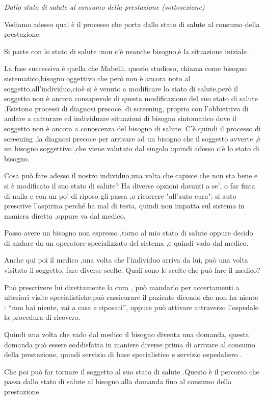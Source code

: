 \documentclass[]{article}
\begin{document}
\emph{Dallo stato di salute al consumo della prestazione (sottosezione)}

Vediamo adesso qual è il processo che porta dallo stato di salute al
consumo della prestazione.

Si parte con lo stato di salute :non c'è neanche bisogno,è la situazione
iniziale .

La fase successiva è quella che Mabelli, questo studioso, chiama come
bisogno sistematico,bisogno oggettivo che però non è ancora noto al
soggetto,all'individuo,cioè si è venuto a modificare lo stato di
salute,però il soggetto non è ancora consapevole di questa modificazione
del suo stato di salute .Esistono processi di diagnosi precoce, di
screening, proprio con l'obbiettivo di andare a catturare ed individuare
situazioni di bisogno sintomatico dove il soggetto non è ancora a
conoscenza del bisogno di salute. C'è quindi il processo di screening
,la diagnosi precoce per arrivare ad un bisogno che il soggetto avverte
,è un bisogno soggettivo ,che viene valutato dal singolo :quindi adesso
c'è lo stato di bisogno.

Cosa può fare adesso il nostro individuo,una volta che capisce che non
sta bene e si è modificato il suo stato di salute? Ha diverse opzioni
davanti a se', o far finta di nulla e con un po' di riposo gli passa ,o
ricorrere "all'auto cura": si auto prescrive l'aspirina perché ha mal di
testa, quindi non impatta sul sistema in maniera diretta ,oppure va dal
medico.

Posso avere un bisogno non espresso ,torno al mio stato di salute oppure
decido di andare da un operatore specializzato del sistema ,e quindi
vado dal medico.

Anche qui poi il medico ,una volta che l'individuo arriva da lui, può
una volta visitato il soggetto, fare diverse scelte. Quali sono le
scelte che può fare il medico?

Può prescrivere lui direttamente la cura , può mandarlo per accertamenti
a ulteriori visite specialistiche,può rassicurare il paziente dicendo
che non ha niente : ``non hai niente, vai a casa e riposati'', oppure
può attivare attraverso l'ospedale la procedura di ricovero.

Quindi una volta che vado dal medico il bisogno diventa una domanda,
questa domanda può essere soddisfatta in maniere diverse prima di
arrivare al consumo della prestazione, quindi servizio di base
specialistico e servizio ospedaliero .

Che poi può far tornare il soggetto al suo stato di salute .Questo è il
percorso che passa dallo stato di salute al bisogno alla domanda fino al
consumo della prestazione.
\end{document}
